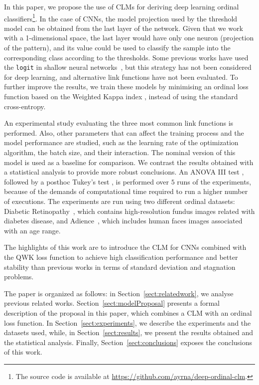 \documentclass[preprint]{elsarticle}
\begin{document}
In this paper, we propose the use of CLMs for deriving deep learning ordinal classifiers\footnote{The source code is available at \url{https://github.com/ayrna/deep-ordinal-clm}.}. In the case of CNNs, the model projection used by the threshold model can be obtained from the last layer of the network. Given that we work with a 1-dimensional space, the last layer would have only one neuron (projection of the pattern), and its value could be used to classify the sample into the corresponding class according to the thresholds. Some previous works have used the \texttt{logit} in shallow neural networks~\cite{gutierrez2016ordinal}, but this strategy has not been considered for deep learning, and alternative link functions have not been evaluated. To further improve the results, we train these models by minimising an ordinal loss function based on the Weighted Kappa index \cite{de2018weighted}, instead of using the standard cross-entropy.

An experimental study evaluating the three most common link functions is performed. Also, other parameters that can affect the training process and the model performance are studied, such as the learning rate of the optimization algorithm, the batch size, and their interaction. The nominal version of this model is used as a baseline for comparison. We contrast the results obtained with a statistical analysis to provide more robust conclusions. An ANOVA III test \cite{miller1997beyond}, followed by a posthoc Tukey's test \cite{tukey1949comparing}, is performed over $5$ runs of the experiments, because of the demands of computational time required to run a higher number of executions. The experiments are run using two different ordinal datasets: Diabetic Retinopathy~\cite{de2018weighted}, which contains high-resolution fundus images related with diabetes disease, and Adience~\cite{beckham2017unimodal}, which includes human faces images associated with an age range.

The highlights of this work are to introduce the CLM for CNNs combined with the QWK loss function to achieve high classification performance and better stability than previous works in terms of standard deviation and stagnation problems.

The paper is organized as follows: in Section~\ref{sect:relatedwork}, we analyse previous related works. Section~\ref{sect:modelProposal} presents a formal description of the proposal in this paper, which combines a CLM with an ordinal loss function. In Section~\ref{sect:experiments}, we describe the experiments and the datasets used, while, in Section~\ref{sect:results}, we present the results obtained and the statistical analysis. Finally, Section~\ref{sect:conclusions} exposes the conclusions of this work.
\end{document}
